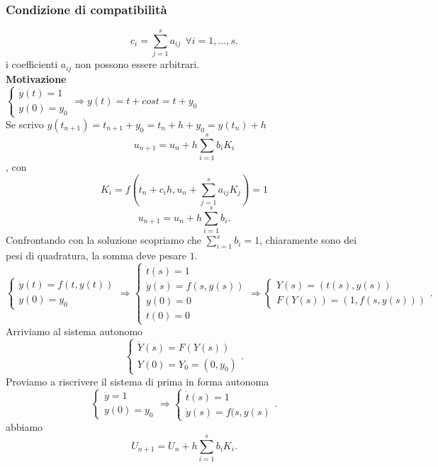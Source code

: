 \documentclass[12px]{article}
\begin{document}
	  \subsubsection{Condizione di compatibilità}
	  \[
		  c_i = \sum^{s}_{j=1}a_{ij} \ \ \forall i=1,\ldots,s
	  .\] 
	  i coefficienti $ a_{ij}$ non possono essere arbitrari.\\[5px]
	  \textbf{Motivazione}\\[5px]
	  $
	  \begin{cases}
	  	\dot y (t) = 1\\
		y(0) = y_0
	  \end{cases} \Rightarrow  y(t) = t + cost = t+ y_0$\\
	  Se scrivo  $y(t_{n+1}) = t_{n+1} + y_0 =t_n + h + y_0= y(t_n) + h$\\
	  \[u_{n+1} = u_n + h \sum^{s}_{i=1}b_iK_i\], con \[K_i = f(t_n+c_ih,u_n + \sum^{s}_{j=1}a_{ij}K_j)=1\]
	  \[
		  u_{n+1} = u_n + h \sum^{s}_{i=1}b_i
	  .\] 
	  Confrontando con la soluzione scopriamo che $ \sum^{s}_{i=1}b_i = 1$, chiaramente sono dei pesi di quadratura, la somma deve pesare $1$.
	  \[
		  \begin{cases}
	  \dot y(t) = f(t,y(t))\\
	  y(0) = y_0
		  \end{cases} \Rightarrow \begin{cases}
		  	\dot t(s) = 1\\
			\dot y(s) = f(s,y(s))\\
			y(0)= 0\\
			t(0) = 0
		  \end{cases} \Rightarrow \begin{cases}
		  	Y(s) =(t(s),y(s))\\
			F(Y(s)) = (1,f(s,y(s)))
		  \end{cases}
	  .\] 
	  Arriviamo al sistema autonomo
	  \[
		  \begin{cases}
	  \dot Y(s) = F(Y(s))\\
	  Y(0) = Y_0 = (0,y_0)
		  \end{cases}
	  .\] 
	  Proviamo a riscrivere il sistema di prima in forma autonoma
	  \[
	  \begin{cases}
	  	\dot y = 1\\
		y(0) = y_0
	  \end{cases} \Rightarrow \begin{cases}
	  	\dot t(s)= 1\\
		\dot y(s) = f(s,y(s)
	  \end{cases}
	  .\] 
	  abbiamo
	  \[
		  U_{n+1} =U_n + h \sum^{s}_{i=1}b_iK_i
	  .\] 
\end{document}
